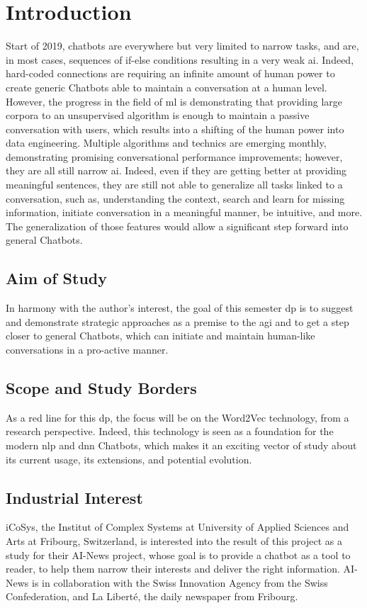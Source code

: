 \chapter{Introduction}
\label{chap:introduction}

Start of 2019, chatbots are everywhere but very limited to narrow tasks, and are, in most cases, sequences of if-else conditions resulting in a very weak \gls{ai}. Indeed, hard-coded connections are requiring an infinite amount of human power to create generic Chatbots able to maintain a conversation at a human level. However, the progress in the field of \gls{ml} is demonstrating that providing large corpora to an unsupervised algorithm is enough to maintain a passive conversation with users, which results into a shifting of the human power into data engineering. Multiple algorithms and technics are emerging monthly, demonstrating promising conversational performance improvements; however, they are all still narrow \acrshort{ai}. Indeed, even if they are getting better at providing meaningful sentences, they are still not able to generalize all tasks linked to a conversation, such as, understanding the context, search and learn for missing information, initiate conversation in a meaningful manner, be intuitive, and more. The generalization of those features would allow a significant step forward into general Chatbots.

\section{Aim of Study}
In harmony with the author's interest, the goal of this semester \gls{dp} is to suggest and demonstrate strategic approaches as a premise to the \acrshort{agi} and to get a step closer to general Chatbots, which can initiate and maintain human-like conversations in a pro-active manner.

\section{Scope and Study Borders}
As a red line for this \gls{dp}, the focus will be on the Word2Vec technology, from a research perspective. Indeed, this technology is seen as a foundation for the modern \acrshort{nlp} and \acrshort{dnn} Chatbots, which makes it an exciting vector of study about its current usage, its extensions, and potential evolution. 

\section{Industrial Interest}
iCoSys, the Institut of Complex Systems at University of Applied Sciences and Arts at Fribourg, Switzerland, is interested into the result of this project as a study for their AI-News project, whose goal is to provide a chatbot as a tool to reader, to help them narrow their interests and deliver the right information. AI-News is in collaboration with the Swiss Innovation Agency from the Swiss Confederation, and La Liberté, the daily newspaper from Fribourg. 